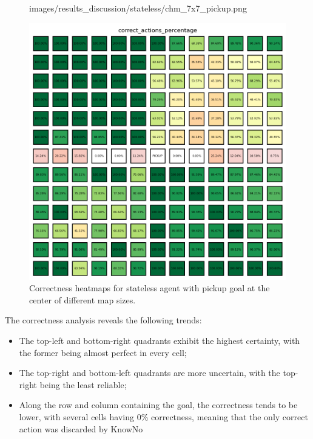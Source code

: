 \begin{figure}[h]
\begin{minipage}[b]{0.32\textwidth}
{      images/results_discussion/stateless/chm_7x7_pickup.png
    }
    \caption{7x7}
    \label{fig:chm_7x7_pickup}
  \end{minipage}
  \hfill
  \begin{minipage}[b]{0.32\textwidth}
    \centering
    \includegraphics[width=\textwidth]{
      images/results_discussion/stateless/chm_13x13_pickup.png
    }
    \caption{13x13}
    \label{fig:chm_13x13_pickup}
  \end{minipage}
  \caption{Correctness heatmaps for stateless agent with pickup goal at the
  center of different map sizes.}
  \label{fig:stateless_pickup_correctness}
\end{figure}
\vspace{5mm}

The correctness analysis reveals the following trends:
\begin{itemize}
  \item The top-left and bottom-right quadrants exhibit the highest certainty,
    with the former being almost perfect in every cell;

  \item The top-right and bottom-left quadrants are more uncertain, with the top-right
    being the least reliable;

  \item Along the row and column containing the goal, the correctness tends to
    be lower, with several cells having 0\% correctness, meaning that the only correct
    action was discarded by KnowNo
\end{itemize}

